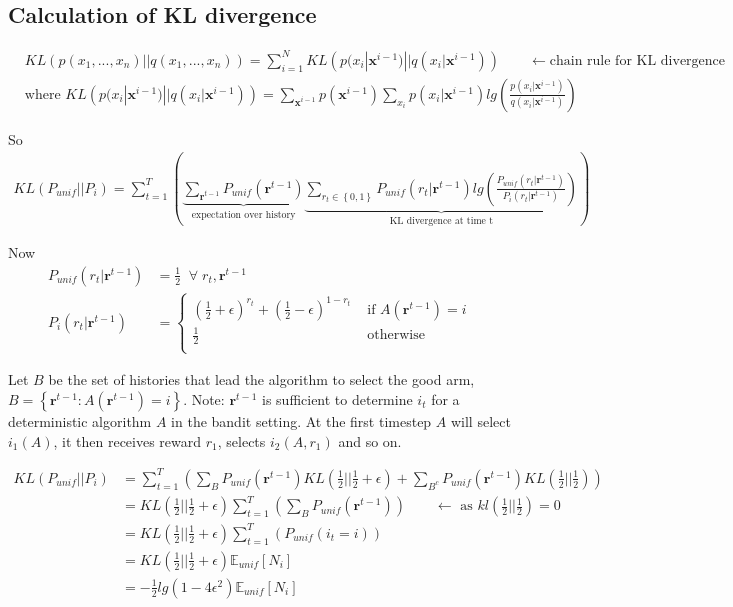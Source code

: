 \documentclass{article}
\newcommand{\E}{\mathbb E}
\newcommand{\set}[1]{\left\{#1\right\}}
\newcommand{\eqn}[1]{\begin{align}#1\end{align}}
\renewcommand{\Pi}[1]{P_i\left( #1 \right)}
\newcommand{\Pu}[1]{P_{unif}\left( #1 \right)}
\newcommand{\Eu}[1]{\E_{unif}\left[ #1 \right]}
\renewcommand{\r}{\boldsymbol{r}}
\renewcommand{\log}[1]{lg\left( #1 \right)}
\newcommand{\kl}[2]{KL\left(#1 || #2 \right)}
\theoremstyle{plain}
\theoremstyle{definition}
\begin{document}
\subsection{Calculation of KL divergence}
\label{sec:calculation_of_divergence}
\eqn{
& \kl{p(x_1,...,x_n)}{q(x_1,...,x_n)} =  \sum_{i=1}^N \kl{p(x_i|\boldsymbol{x}^{i-1})}{q(x_i|\boldsymbol{x}^{i-1})} \qquad \leftarrow \text{chain rule for KL divergence} \\
& \text{where } \kl{p(x_i|\boldsymbol{x}^{i-1})}{q(x_i|\boldsymbol{x}^{i-1})} = 
\sum_{\boldsymbol{x}^{i-1}}p(\boldsymbol{x}^{i-1})\sum_{x_i}p(x_i|\boldsymbol{x}^{i-1})\log{\frac{p(x_i|\boldsymbol{x}^{i-1})}{q(x_i|\boldsymbol{x}^{i-1})}}
}

So 
\eqn {
\kl{P_{unif}}{P_i} = \sum_{t=1}^T\left(
\underbrace{\sum_{\r^{t-1}}\Pu{\r^{t-1}}}_{\text{expectation over history}}
\underbrace{\sum_{r_t \in \set{0,1}}\Pu{r_t|\r^{t-1}}\log{\frac{\Pu{r_t|\r^{t-1}}}{\Pi{r_t|\r^{t-1}}}}}_{\text{KL divergence at time t}}
\right)
}

Now 
\eqn{
\Pu{r_t|\r^{t-1}}& = \frac{1}{2} \;\; \forall \;{r_t,\r^{t-1}} \\
\Pi{r_t|\r^{t-1}}&=
\begin{cases}
(\frac{1}{2}+\epsilon)^{r_t}+(\frac{1}{2}-\epsilon)^{1-r_t} & \text{ if } A(\r^{t-1}) = i\\
\frac{1}{2} & \text{ otherwise}\\
\end{cases}
}

Let $B$ be the set of histories that lead the algorithm to select the good arm, $B =\set{ \r^{t-1}:A(\r^{t-1})=i}$. Note: $\r^{t-1}$ is sufficient to determine $i_t$ for a deterministic algorithm $A$ in the bandit setting. At the first timestep $A$ will select $i_1(A)$, it then receives reward $r_1$, selects $i_2(A,r_1)$ and so on.

\eqn {
\kl{P_{unif}}{P_i} &= \sum_{t=1}^T\left(
\sum_{B}\Pu{\r^{t-1}}
\kl{\frac{1}{2}}{\frac{1}{2}+\epsilon}
+ \sum_{B^c}\Pu{\r^{t-1}}
\kl{\frac{1}{2}}{\frac{1}{2}}
\right)\\
&= \kl{\frac{1}{2}}{\frac{1}{2}+\epsilon}\sum_{t=1}^T\left(
\sum_{B}\Pu{\r^{t-1}}
\right) \qquad \leftarrow \text{ as $kl(\frac{1}{2}||\frac{1}{2}) = 0$}\\
&=\kl{\frac{1}{2}}{\frac{1}{2}+\epsilon} \sum_{t=1}^T\left(
\Pu{i_t=i}
\right)\\
&=\kl{\frac{1}{2}}{\frac{1}{2}+\epsilon}\Eu{N_i}\\
&=-\frac{1}{2}\log{1-4\epsilon^2}\Eu{N_i}
}
\pagebreak
\end{document}
